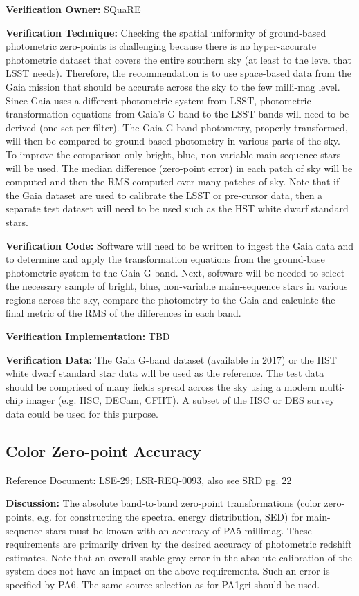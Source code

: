 \documentclass[DM,lsstdraft,toc]{lsstdoc}
\begin{document}
\textbf{Verification Owner:} SQuaRE

\textbf{Verification Technique:} Checking the spatial uniformity of
ground-based photometric zero-points is challenging because there is no
hyper-accurate photometric dataset that covers the entire southern sky
(at least to the level that LSST needs). Therefore, the recommendation
is to use space-based data from the Gaia mission that should be accurate
across the sky to the few milli-mag level. Since Gaia uses a different
photometric system from LSST, photometric transformation equations from
Gaia's G-band to the LSST bands will need to be derived (one set per
filter). The Gaia G-band photometry, properly transformed, will then be
compared to ground-based photometry in various parts of the sky. To
improve the comparison only bright, blue, non-variable main-sequence
stars will be used. The median difference (zero-point error) in each
patch of sky will be computed and then the RMS computed over many
patches of sky. Note that if the Gaia dataset are used to calibrate the
LSST or pre-cursor data, then a separate test dataset will need to be
used such as the HST white dwarf standard stars.

\textbf{Verification Code:} Software will need to be written to ingest
the Gaia data and to determine and apply the transformation equations
from the ground-base photometric system to the Gaia G-band. Next,
software will be needed to select the necessary sample of bright, blue,
non-variable main-sequence stars in various regions across the sky,
compare the photometry to the Gaia and calculate the final metric of the
RMS of the differences in each band.

\textbf{Verification Implementation:} TBD

\textbf{Verification Data:} The Gaia G-band dataset (available in 2017)
or the HST white dwarf standard star data will be used as the reference.
The test data should be comprised of many fields spread across the sky
using a modern multi-chip imager (e.g. HSC, DECam, CFHT). A subset of
the HSC or DES survey data could be used for this purpose.

\subsection{Color Zero-point Accuracy}\label{color-zero-point-accuracy}

Reference Document: LSE-29; LSR-REQ-0093, also see SRD pg. 22

\textbf{Discussion:} The absolute band-to-band zero-point
transformations (color zero-points, e.g. for constructing the spectral
energy distribution, SED) for main-sequence stars must be known with an
accuracy of PA5 millimag. These requirements are primarily driven by the
desired accuracy of photometric redshift estimates. Note that an overall
stable gray error in the absolute calibration of the system does not
have an impact on the above requirements. Such an error is specified by
PA6. The same source selection as for PA1gri should be used.
\end{document}
